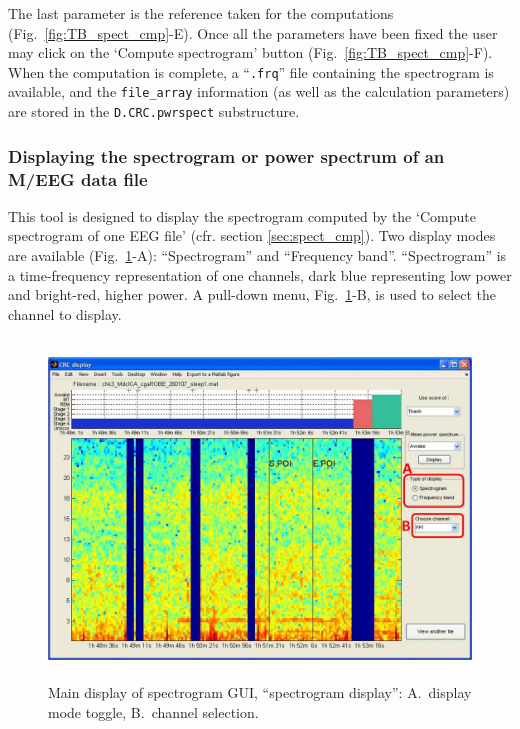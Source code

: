 \documentclass[a4paper,titlepage]{article}
\begin{document}
The last parameter is the reference taken for the computations (Fig.~\ref{fig:TB_spect_cmp}-E). Once all the parameters have been fixed the user may click on the `Compute spectrogram' button (Fig.~\ref{fig:TB_spect_cmp}-F). When the computation is complete, a ``{\tt .frq}'' file containing the spectrogram is available, and the {\tt file\_array} information (as well as the calculation parameters) are stored in the {\tt D.CRC.pwrspect} substructure.

\subsubsection{Displaying the spectrogram or power spectrum of an M/EEG data file}
\label{sec:spect_dis}
This tool is designed to display the spectrogram computed by the `Compute spectrogram of one EEG file' (cfr. section \ref{sec:spect_cmp}). Two display modes are available (Fig.~\ref{fig:TB_disfrq1}-A): ``Spectrogram'' and ``Frequency band''. ``Spectrogram'' is a time-frequency representation of one channels, dark blue representing low power and bright-red, higher power. A pull-down menu, Fig.~\ref{fig:TB_disfrq1}-B, is used to select the channel to display.

\begin{figure}[ht]
	\centering
		\includegraphics[width=15cm,height=9cm]{images/FIG7_disfreq_spectro.jpg}
	\caption{Main display of spectrogram GUI, ``spectrogram display'': A.~display mode toggle, B.~channel selection.
	\label{fig:TB_disfrq1}}
\end{figure}
\end{document}
